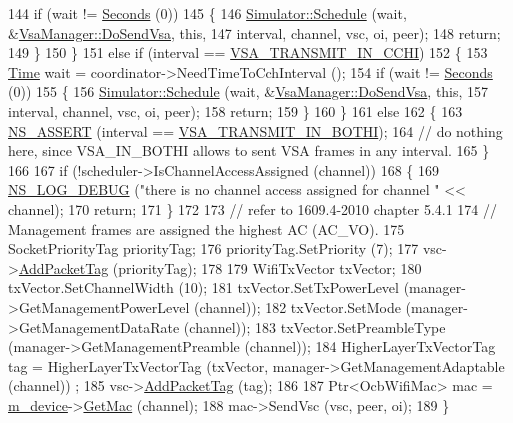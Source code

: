 \begin{DoxyCode}
144       \textcolor{keywordflow}{if} (wait != \hyperlink{group__timecivil_ga33c34b816f8ff6628e33d5c8e9713b9e}{Seconds} (0))
145         \{
146           \hyperlink{classns3_1_1Simulator_a671882c894a08af4a5e91181bf1eec13}{Simulator::Schedule} (wait, &\hyperlink{classns3_1_1VsaManager_a3d56f68f3b98bd45ccc6c56c9a6244db}{VsaManager::DoSendVsa}, \textcolor{keyword}{this},
147                                interval, channel, vsc, oi, peer);
148           \textcolor{keywordflow}{return};
149         \}
150     \}
151   \textcolor{keywordflow}{else} \textcolor{keywordflow}{if} (interval == \hyperlink{namespacens3_a417ab130a77d452a8b5014090665bcc1a2892e80beed7d3cc2ec6a4b8acf05676}{VSA\_TRANSMIT\_IN\_CCHI})
152     \{
153       \hyperlink{namespacens3_1_1TracedValueCallback_a7ffd3e7c142ffe7c8a1d2db9b8de38ec}{Time} wait = coordinator->NeedTimeToCchInterval ();
154       \textcolor{keywordflow}{if} (wait != \hyperlink{group__timecivil_ga33c34b816f8ff6628e33d5c8e9713b9e}{Seconds} (0))
155         \{
156           \hyperlink{classns3_1_1Simulator_a671882c894a08af4a5e91181bf1eec13}{Simulator::Schedule} (wait, &\hyperlink{classns3_1_1VsaManager_a3d56f68f3b98bd45ccc6c56c9a6244db}{VsaManager::DoSendVsa}, \textcolor{keyword}{this},
157                                interval, channel, vsc, oi, peer);
158           \textcolor{keywordflow}{return};
159         \}
160     \}
161   \textcolor{keywordflow}{else}
162     \{
163       \hyperlink{assert_8h_a6dccdb0de9b252f60088ce281c49d052}{NS\_ASSERT} (interval == \hyperlink{namespacens3_a417ab130a77d452a8b5014090665bcc1aae42365483bb4ad44a43f5e31f4a3495}{VSA\_TRANSMIT\_IN\_BOTHI});
164       \textcolor{comment}{// do nothing here, since VSA\_IN\_BOTHI allows to sent VSA frames in any interval.}
165     \}
166 
167   \textcolor{keywordflow}{if} (!scheduler->IsChannelAccessAssigned (channel))
168     \{
169       \hyperlink{group__logging_ga413f1886406d49f59a6a0a89b77b4d0a}{NS\_LOG\_DEBUG} (\textcolor{stringliteral}{"there is no channel access assigned for channel "} << channel);
170       \textcolor{keywordflow}{return};
171     \}
172 
173   \textcolor{comment}{// refer to 1609.4-2010 chapter 5.4.1}
174   \textcolor{comment}{// Management frames are assigned the highest AC (AC\_VO).}
175   SocketPriorityTag priorityTag;
176   priorityTag.SetPriority (7);
177   vsc->\hyperlink{classns3_1_1Packet_a7400b8655852f5271c5957250d0141af}{AddPacketTag} (priorityTag);
178 
179   WifiTxVector txVector;
180   txVector.SetChannelWidth (10);
181   txVector.SetTxPowerLevel (manager->GetManagementPowerLevel (channel));
182   txVector.SetMode (manager->GetManagementDataRate (channel));
183   txVector.SetPreambleType (manager->GetManagementPreamble (channel));
184   HigherLayerTxVectorTag tag = HigherLayerTxVectorTag (txVector, manager->GetManagementAdaptable (channel))
      ;
185   vsc->\hyperlink{classns3_1_1Packet_a7400b8655852f5271c5957250d0141af}{AddPacketTag} (tag);
186 
187   Ptr<OcbWifiMac> mac = \hyperlink{classns3_1_1VsaManager_a52ae414f7b31a4d8b9c572689b7a7108}{m\_device}->\hyperlink{classns3_1_1WaveNetDevice_a899f670dd8eb023f0e40f19b536724eb}{GetMac} (channel);
188   mac->SendVsc (vsc, peer, oi);
189 \}
\end{DoxyCode}


